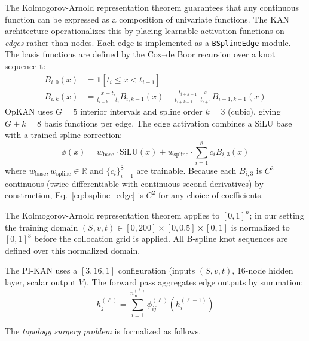 \documentclass[11pt,a4paper]{article}
\begin{document}
The Kolmogorov-Arnold representation theorem \citep{kolmogorov1957representation}
guarantees that any continuous function can be expressed as a composition of
univariate functions. The KAN architecture \citep{liu_etal_2024_kan} operationalizes
this by placing learnable activation functions on \emph{edges} rather than nodes.
Each edge is implemented as a \texttt{BSplineEdge} module. The basis functions are
defined by the Cox--de Boor recursion over a knot sequence $\mathbf{t}$:
\begin{align}
B_{i,0}(x) &= \mathbf{1}[t_i \leq x < t_{i+1}] \label{eq:cox_de_boor_1} \\
B_{i,k}(x) &= \frac{x - t_i}{t_{i+k} - t_i} B_{i,k-1}(x)
             + \frac{t_{i+k+1} - x}{t_{i+k+1} - t_{i+1}} B_{i+1,k-1}(x)
\label{eq:cox_de_boor_2}
\end{align}
OpKAN uses $G=5$ interior intervals and spline order $k=3$ (cubic), giving $G+k=8$
basis functions per edge. The edge activation combines a SiLU base with a trained
spline correction:
\begin{equation}
\phi(x) = w_\text{base} \cdot \text{SiLU}(x)
         + w_\text{spline} \cdot \sum_{i=1}^{8} c_i B_{i,3}(x)
\label{eq:bspline_edge}
\end{equation}
where $w_\text{base}, w_\text{spline} \in \mathbb{R}$ and $\{c_i\}_{i=1}^8$ are
trainable. Because each $B_{i,3}$ is $C^2$ continuous (twice-differentiable with continuous second derivatives) by construction, Eq.~\eqref{eq:bspline_edge}
is $C^2$ for any choice of coefficients.

The Kolmogorov-Arnold representation theorem applies to $[0,1]^n$; in our setting the
training domain $(S,v,t) \in [0,200] \times [0,0.5] \times [0,1]$ is normalized to
$[0,1]^3$ before the collocation grid is applied. All B-spline knot sequences are
defined over this normalized domain.

The PI-KAN uses a $[3, 16, 1]$ configuration (inputs $(S,v,t)$, 16-node hidden layer,
scalar output $V$). The forward pass aggregates edge outputs by summation:
\begin{equation}
h_j^{(\ell)} = \sum_{i=1}^{n_\text{in}^{(\ell)}} \phi_{ij}^{(\ell)}\!\left(h_i^{(\ell-1)}\right)
\label{eq:kan_forward}
\end{equation}

The \emph{topology surgery problem} is formalized as follows.
\end{document}

